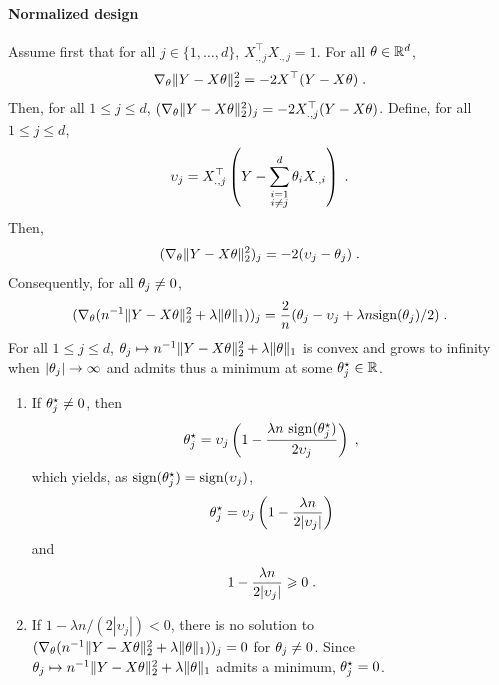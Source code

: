 \paragraph{{\bf Normalized design} } Assume first that for all $j\in\{1,\ldots,d\}$,  $X_{.,j}^\top X_{.,j} = 1$. 
For all $\theta \in \mathbb{R}^d$, 
\[
\nabla_\theta \|Y - X\theta\|_2^2 = - 2 X^\top (Y-X\theta)\;.
\]
Then, for all $1\leqslant j \leqslant d$, $(\nabla_\theta \|Y - X\theta\|_2^2)_j = -2 X_{.,j}^\top (Y-X\theta)$. 
Define, for all $1\leqslant j \leqslant d$,
\[
\upsilon_{j}=X_{.,j}^\top\left(Y-\sum_{\substack{i=1\\ i\neq j}}^d\theta_{i} X_{.,i}\right)\;.
\]
Then,
\[
(\nabla_\theta \|Y - X\theta\|_2^2)_j = -2( \upsilon_j - \theta_j)\;.
\]
Consequently, for all $\theta_j \neq 0$, 
\[
(\nabla_\theta ( n^{-1}\|Y - X\theta\|_2^2 +  \lambda\|\theta\|_1))_j= \frac{2}{n}( \theta_j - \upsilon_j + \lambda n\textrm{sign}(\theta_j)/2)\;.
\]
For all $1\leqslant j\leqslant d$,  $\theta_j \mapsto  n^{-1}\|Y - X\theta\|_2^2 + \lambda\|\theta\|_1$ is convex and grows to infinity when $|\theta_j|\to \infty$ and admits thus a minimum at some $\theta_j^{\star}\in\mathbb{R}$. 
\begin{enumerate}[-]
\item If $\theta_j^{\star} \neq 0$, then
\[
\theta_j^{\star} = \upsilon_j\left( 1 - \frac{\lambda n~\textrm{sign}(\theta_j^{\star})}{2 \upsilon_j}\right)\;,
\]
which yields, as  $\textrm{sign}(\theta_j^{\star}) = \textrm{sign}(\upsilon_j)$,
\[
\theta_j^{\star} = \upsilon_j\left(1 - \frac{\lambda n }{2 |\upsilon_j|}\right)
\]
and
\[
1 - \frac{\lambda n }{2 |\upsilon_j|} \geqslant 0\;.
\]
\item If $1 - \lambda n/(2 |\upsilon_j|)<0$, there is no solution to $(\nabla_\theta ( n^{-1}\|Y - X\theta\|_2^2 +  \lambda\|\theta\|_1))_j=0$ for $\theta_j \neq 0$.  Since $\theta_j \mapsto  n^{-1}\|Y - X\theta\|_2^2 + \lambda\|\theta\|_1$ admits a minimum, $\theta_j^{\star}=0$. 
\end{enumerate}
